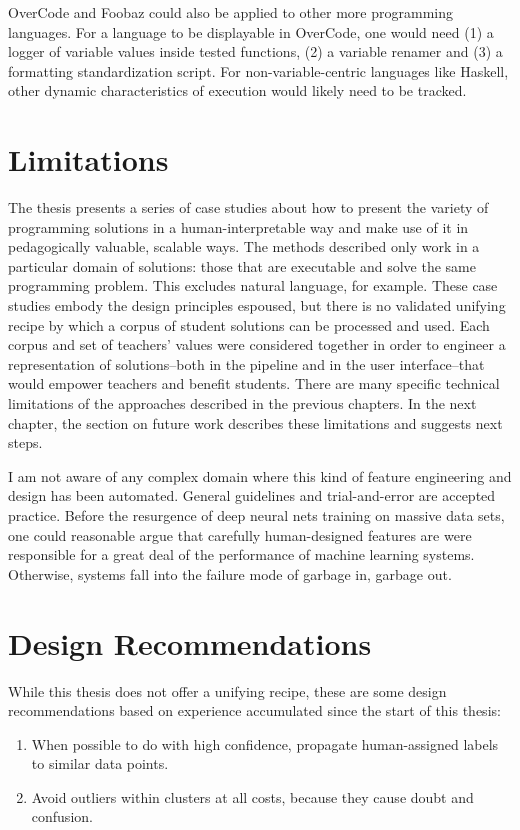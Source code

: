 OverCode and Foobaz could also be applied to other more programming languages. For a language to be displayable in OverCode, one would need (1) a logger of variable values inside tested functions, (2) a variable renamer and (3) a formatting standardization script. For non-variable-centric languages like Haskell, other dynamic characteristics of execution would likely need to be tracked.

\section{Limitations}

The thesis presents a series of case studies about how to present the variety of programming solutions in a human-interpretable way and make use of it in pedagogically valuable, scalable ways. The methods described only work in a particular domain of solutions: those that are executable and solve the same programming problem. This excludes natural language, for example. These case studies embody the design principles espoused, but there is no validated unifying recipe by which a corpus of student solutions can be processed and used. Each corpus and set of teachers' values were considered together in order to engineer a representation of solutions--both in the pipeline and in the user interface--that would empower teachers and benefit students. There are many specific technical limitations of the approaches described in the previous chapters. In the next chapter, the section on future work describes these limitations and suggests next steps.

I am not aware of any complex domain where this kind of feature engineering and design has been automated. General guidelines and trial-and-error are accepted practice. Before the resurgence of deep neural nets training on massive data sets, one could reasonable argue that carefully human-designed features are were responsible for a great deal of the performance of machine learning systems. Otherwise, systems fall into the failure mode of garbage in, garbage out.

\section{Design Recommendations}

While this thesis does not offer a unifying recipe, these are some design recommendations based on experience accumulated since the start of this thesis:
\begin{enumerate}
\item When possible to do with high confidence, propagate human-assigned labels to similar data points.%
\item Avoid outliers within clusters at all costs, because they cause doubt and confusion. 
\end{enumerate}

